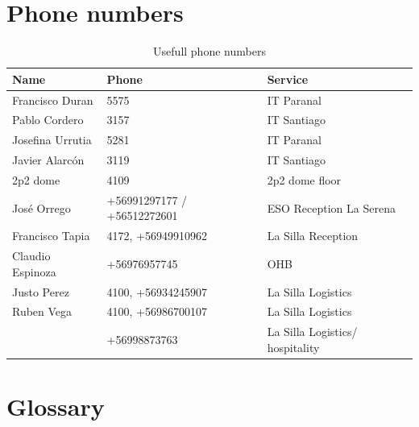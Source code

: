 \documentclass[11pt,fleqn,a4paper]{book}
\begin{document}
\section{Phone numbers}
\begin{table}
\caption{Usefull phone numbers}
\label{tab:phone}
\centering
\begin{tabular}{lll}
\hline
Name                    &  Phone                                            & Service\\
\hline\hline
Francisco Duran	        & 5575                                              & IT Paranal \\
Pablo Cordero           & 3157                                              & IT Santiago \\
Josefina Urrutia        & 5281                                              & IT Paranal \\
Javier Alarc\'on        & 3119                                              & IT Santiago \\
 2p2 dome               & 4109                                              & 2p2 dome floor\\
 Jos\'e Orrego          & +56991297177 / +56512272601                       & ESO Reception La Serena\\
 Francisco Tapia        & 4172, +56949910962                                & La Silla Reception\\
 Claudio Espinoza       & +56976957745                                      & OHB \\
 Justo Perez            & 4100, +56934245907                                & La Silla Logistics\\
 Ruben Vega             & 4100, +56986700107                                & La Silla Logistics\\
                        & +56998873763                                      & La Silla Logistics/ hospitality\\
 \hline
\end{tabular}
\end{table}


\section{Glossary}
\printglossaries
{}
\end{document}

